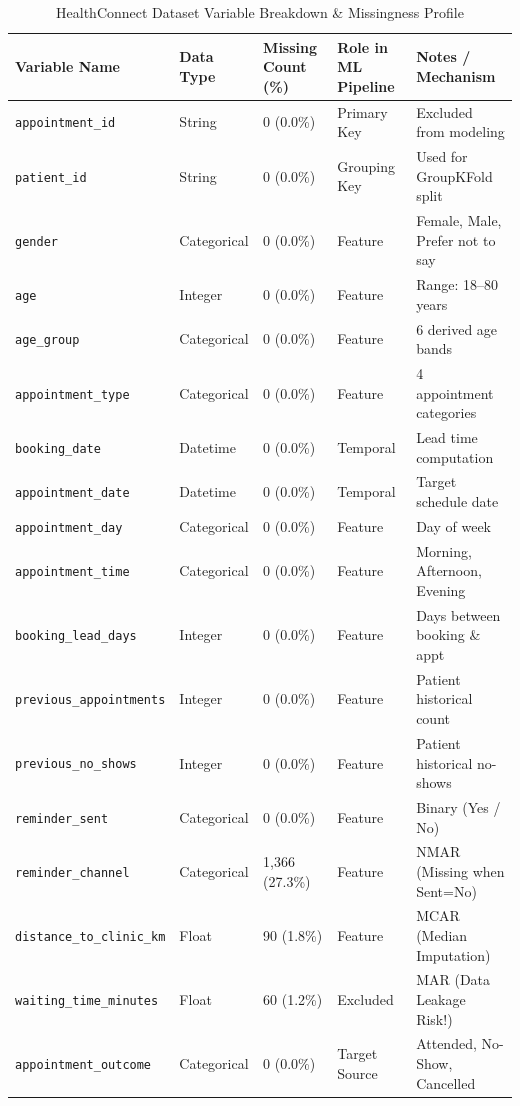 \documentclass[11pt,a4paper]{article}
\begin{document}
\begin{table}[h!]
\centering
\caption{HealthConnect Dataset Variable Breakdown \& Missingness Profile}
\label{tab:data_dict}
\small
\begin{tabular}{lllll}
\toprule
\textbf{Variable Name} & \textbf{Data Type} & \textbf{Missing Count (\%)} & \textbf{Role in ML Pipeline} & \textbf{Notes / Mechanism} \\
\midrule
\texttt{appointment\_id} & String & 0 (0.0\%) & Primary Key & Excluded from modeling \\
\texttt{patient\_id} & String & 0 (0.0\%) & Grouping Key & Used for GroupKFold split \\
\texttt{gender} & Categorical & 0 (0.0\%) & Feature & Female, Male, Prefer not to say \\
\texttt{age} & Integer & 0 (0.0\%) & Feature & Range: 18--80 years \\
\texttt{age\_group} & Categorical & 0 (0.0\%) & Feature & 6 derived age bands \\
\texttt{appointment\_type} & Categorical & 0 (0.0\%) & Feature & 4 appointment categories \\
\texttt{booking\_date} & Datetime & 0 (0.0\%) & Temporal & Lead time computation \\
\texttt{appointment\_date} & Datetime & 0 (0.0\%) & Temporal & Target schedule date \\
\texttt{appointment\_day} & Categorical & 0 (0.0\%) & Feature & Day of week \\
\texttt{appointment\_time} & Categorical & 0 (0.0\%) & Feature & Morning, Afternoon, Evening \\
\texttt{booking\_lead\_days} & Integer & 0 (0.0\%) & Feature & Days between booking \& appt \\
\texttt{previous\_appointments} & Integer & 0 (0.0\%) & Feature & Patient historical count \\
\texttt{previous\_no\_shows} & Integer & 0 (0.0\%) & Feature & Patient historical no-shows \\
\texttt{reminder\_sent} & Categorical & 0 (0.0\%) & Feature & Binary (Yes / No) \\
\texttt{reminder\_channel} & Categorical & 1,366 (27.3\%) & Feature & NMAR (Missing when Sent=No) \\
\texttt{distance\_to\_clinic\_km} & Float & 90 (1.8\%) & Feature & MCAR (Median Imputation) \\
\texttt{waiting\_time\_minutes} & Float & 60 (1.2\%) & Excluded & MAR (Data Leakage Risk!) \\
\texttt{appointment\_outcome} & Categorical & 0 (0.0\%) & Target Source & Attended, No-Show, Cancelled \\
\bottomrule
\end{tabular}
\end{table}
\end{document}
